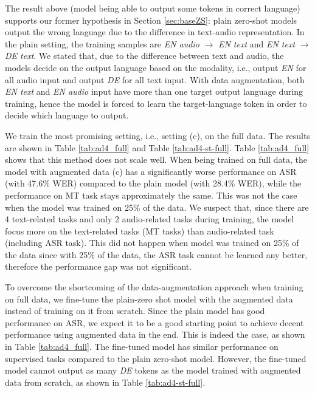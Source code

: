 \documentclass[conference]{IEEEtran}
\begin{document}
	The result above (model being able to output some tokens in correct language) supports our former hypothesis in Section \ref{sec:baseZS}: plain zero-shot models output the wrong language due to the difference in text-audio representation. In the plain setting, the training samples are \textit{EN audio} $\rightarrow$ \textit{EN text} and \textit{EN text} $\rightarrow$ \textit{DE text}. We stated that, due to the difference between text and audio, the models decide on the output language based on the modality, i.e., output \textit{EN} for all audio input and output \textit{DE} for all text input. With data augmentation, both \textit{EN text} and \textit{EN audio} input have more than one target output language during training, hence the model is forced to learn the target-language token in order to decide which language to output.
	
	We train the most promising setting, i.e., setting (c), on the full data. The results are shown in Table \ref{tab:ad4_full} and Table \ref{tab:ad4-st-full}. Table \ref{tab:ad4_full} shows that this method does not scale well. When being trained on full data, the model with augmented data (c) has a significantly worse performance on ASR (with 47.6\% WER) compared to the plain model (with 28.4\% WER), while the performance on MT task stays approximately the same. This was not the case when the model was trained on 25\% of the data. We suspect that, since there are 4 text-related tasks and only 2 audio-related tasks during training, the model focus more on the text-related tasks (MT tasks) than audio-related task (including ASR task). This did not happen when model was trained on 25\% of the data since with 25\% of the data, the ASR task cannot be learned any better, therefore the performance gap was not significant. 
	
	To overcome the shortcoming of the data-augmentation approach when training on full data, we fine-tune the plain-zero shot model with the augmented data instead of training on it from scratch. Since the plain model has good performance on ASR, we expect it to be a good starting point to achieve decent performance using augmented data in the end. This is indeed the case, as shown in Table \ref{tab:ad4_full}. The fine-tuned model has similar performance on supervised tasks compared to the plain zero-shot model. However, the fine-tuned model cannot output as many \textit{DE} tokens as the model trained with augmented data from scratch, as shown in Table \ref{tab:ad4-st-full}. %
	
\end{document}
